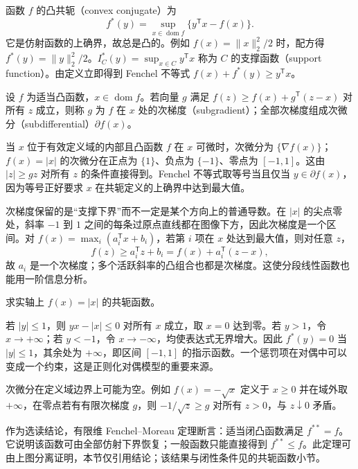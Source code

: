 函数 $f$ 的凸共轭（convex conjugate）为
\begin{equation}
 f^*(y)=\sup_{x\in\operatorname{dom}f}\{y^{\mathsf T}x-f(x)\}.
 \label{eq:co-conjugate}
\end{equation}
它是仿射函数的上确界，故总是凸的。例如 $f(x)=\|x\|_2^2/2$ 时，配方得 $f^*(y)=\|y\|_2^2/2$。$I_C^*(y)=\sup_{x\in C}y^{\mathsf T}x$ 称为 $C$ 的支撑函数（support function）。由定义立即得到 Fenchel 不等式 $f(x)+f^*(y)\geq y^{\mathsf T}x$。

\begin{definition}
设 $f$ 为适当凸函数，$x\in\operatorname{dom}f$。若向量 $g$ 满足 $f(z)\geq f(x)+g^{\mathsf T}(z-x)$ 对所有 $z$ 成立，则称 $g$ 为 $f$ 在 $x$ 处的次梯度（subgradient）；全部次梯度组成次微分（subdifferential）$\partial f(x)$。
\end{definition}

当 $x$ 位于有效定义域的内部且凸函数 $f$ 在 $x$ 可微时，次微分为 $\{\nabla f(x)\}$；$f(x)=|x|$ 的次微分在正点为 $\{1\}$、负点为 $\{-1\}$、零点为 $[-1,1]$。这由 $|z|\geq gz$ 对所有 $z$ 的条件直接得到。Fenchel 不等式取等号当且仅当 $y\in\partial f(x)$，因为等号正好要求 $x$ 在共轭定义的上确界中达到最大值。

次梯度保留的是“支撑下界”而不一定是某个方向上的普通导数。在 $|x|$ 的尖点零处，斜率 $-1$ 到 $1$ 之间的每条过原点直线都在图像下方，因此次梯度是一个区间。对 $f(x)=\max_i(a_i^{\mathsf T}x+b_i)$，若第 $i$ 项在 $x$ 处达到最大值，则对任意 $z$，
\[
 f(z)\geq a_i^{\mathsf T}z+b_i
 =f(x)+a_i^{\mathsf T}(z-x),
\]
故 $a_i$ 是一个次梯度；多个活跃斜率的凸组合也都是次梯度。这使分段线性函数也能用一阶信息分析。

\begin{example}[绝对值的共轭]
求实轴上 $f(x)=|x|$ 的共轭函数。
\end{example}
\begin{solve}
若 $|y|\leq1$，则 $yx-|x|\leq0$ 对所有 $x$ 成立，取 $x=0$ 达到零。若 $y>1$，令 $x\to+\infty$；若 $y<-1$，令 $x\to-\infty$，均使表达式无界增大。因此 $f^*(y)=0$ 当 $|y|\leq1$，其余处为 $+\infty$，即区间 $[-1,1]$ 的指示函数。一个惩罚项在对偶中可以变成一个约束，这是正则化对偶模型的重要来源。
\end{solve}

次微分在定义域边界上可能为空。例如 $f(x)=-\sqrt{x}$ 定义于 $x\geq0$ 并在域外取 $+\infty$，在零点若有有限次梯度 $g$，则 $-1/\sqrt z\geq g$ 对所有 $z>0$，与 $z\downarrow0$ 矛盾。

作为选读结论，有限维 Fenchel--Moreau 定理断言：适当闭凸函数满足 $f^{**}=f$。它说明该函数可由全部仿射下界恢复；一般函数只能直接得到 $f^{**}\leq f$。此定理可由上图分离证明，本节仅引用结论；该结果与闭性条件见\cite{boyd-vandenberghe}的共轭函数小节。

